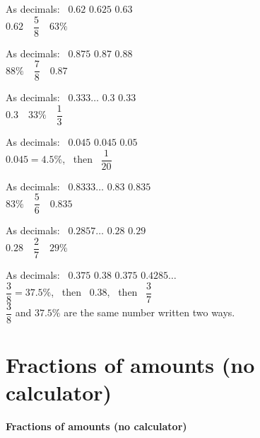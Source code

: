 \documentclass[aspectratio=169]{beamer}
\newcommand{\qtopic}[1]{%
  \section{#1}%
  \begin{frame}[plain]
    \vfill
    \begin{center}
      {\usebeamercolor[fg]{structure}\Huge\bfseries #1}
    \end{center}
    \vfill
  \end{frame}%
}
\begin{document}
  {As decimals: \ $0.62$ \quad $0.625$ \quad $0.63$\\[0.4em]
   $0.62\quad \dfrac58\quad 63\%$}

  {As decimals: \ $0.875$ \quad $0.87$ \quad $0.88$\\[0.4em]
   $88\%\quad \dfrac78\quad 0.87$}

  {As decimals: \ $0.333\ldots$ \quad $0.3$ \quad $0.33$\\[0.4em]
   $0.3\quad 33\%\quad \dfrac13$}

  {As decimals: \ $0.045$ \quad $0.045$ \quad $0.05$\\[0.4em]
   $0.045=4.5\%$, \ then \ $\dfrac{1}{20}$}

  {As decimals: \ $0.8333\ldots$ \quad $0.83$ \quad $0.835$\\[0.4em]
   $83\%\quad \dfrac56\quad 0.835$}

  {As decimals: \ $0.2857\ldots$ \quad $0.28$ \quad $0.29$\\[0.4em]
   $0.28\quad \dfrac27\quad 29\%$}

  {As decimals: \ $0.375$ \quad $0.38$ \quad $0.375$ \quad $0.4285\ldots$\\[0.4em]
   $\dfrac38=37.5\%$, \ then \ $0.38$, \ then \ $\dfrac37$\\[0.4em]
   $\dfrac38$ and $37.5\%$ are the same number written two ways.}

\qtopic{Fractions of amounts (no calculator)}
\end{document}
